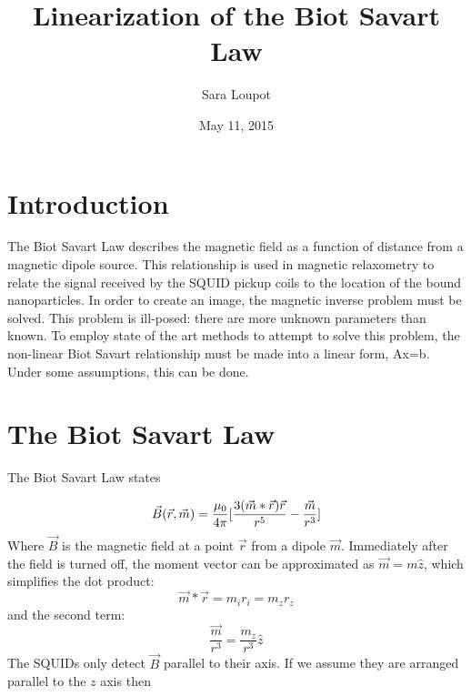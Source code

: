 \documentclass[a4paper]{article}
\title{Linearization of the Biot Savart Law}
\author{Sara Loupot}
\date{May 11, 2015}
\begin{document}
\maketitle
\section{Introduction}
The Biot Savart Law describes the magnetic field as a function of distance from a magnetic dipole source.    This relationship is used in magnetic relaxometry to relate the signal received by the SQUID pickup coils to the location of the bound nanoparticles.  In order to create an image, the magnetic inverse problem must be solved.  This problem is ill-posed: there are more unknown parameters than known.  To employ state of the art methods to attempt to solve this problem, the non-linear Biot Savart relationship must be made into a linear form, Ax=b.  Under some assumptions, this can be done.

\section{The Biot Savart Law}
The Biot Savart Law states

\begin{equation}
\centering
  \vec{B}(\vec{r},\vec{m}) = \frac{\mu_{0}}{4\pi}[\frac{3(\vec{m}*\vec{r})\vec{r}}{r^{5}}-\frac{\vec{m}}{r^{3}}]
  \label{eq:BiotSavart}
\end{equation}
Where $\vec{B}$ is the magnetic field at a point $\vec{r}$ from a dipole $\vec{m}$.  Immediately after the field is turned off, the moment vector can be approximated as $\vec{m}= m\hat{z}$, which simplifies the dot product:
\[\vec{m}*\vec{r}= m_{i}r_{i} = m_{z}r_{z}\]
and the second term:
\[\frac{\vec{m}}{r^{3}} = \frac{m_{z}}{r^{3}}\hat{z}\]
The SQUIDs only detect $\vec{B}$ parallel to their axis.  If we assume they are arranged parallel to the $z$ axis then
\end{document}
